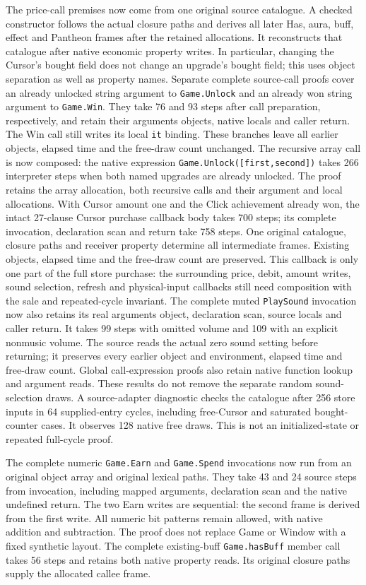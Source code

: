 \documentclass[11pt,a4paper]{article}
\numberwithin{equation}{section}
\theoremstyle{definition}
\theoremstyle{remark}
\begin{document}
The price-call premises now come from one original source catalogue. A checked constructor follows the actual closure paths and derives all later Has, aura, buff, effect and Pantheon frames after the retained allocations. It reconstructs that catalogue after native economic property writes. In particular, changing the Cursor's bought field does not change an upgrade's bought field; this uses object separation as well as property names. Separate complete source-call proofs cover an already unlocked string argument to \texttt{Game.Unlock} and an already won string argument to \texttt{Game.Win}. They take 76 and 93 steps after call preparation, respectively, and retain their arguments objects, native locals and caller return. The Win call still writes its local \texttt{it} binding. These branches leave all earlier objects, elapsed time and the free-draw count unchanged. The recursive array call is now composed: the native expression \texttt{Game.Unlock([first,second])} takes 266 interpreter steps when both named upgrades are already unlocked. The proof retains the array allocation, both recursive calls and their argument and local allocations. With Cursor amount one and the Click achievement already won, the intact 27-clause Cursor purchase callback body takes 700 steps; its complete invocation, declaration scan and return take 758 steps. One original catalogue, closure paths and receiver property determine all intermediate frames. Existing objects, elapsed time and the free-draw count are preserved. This callback is only one part of the full store purchase: the surrounding price, debit, amount writes, sound selection, refresh and physical-input callbacks still need composition with the sale and repeated-cycle invariant. The complete muted \texttt{PlaySound} invocation now also retains its real arguments object, declaration scan, source locals and caller return. It takes 99 steps with omitted volume and 109 with an explicit nonmusic volume. The source reads the actual zero sound setting before returning; it preserves every earlier object and environment, elapsed time and free-draw count. Global call-expression proofs also retain native function lookup and argument reads. These results do not remove the separate random sound-selection draws. A source-adapter diagnostic checks the catalogue after 256 store inputs in 64 supplied-entry cycles, including free-Cursor and saturated bought-counter cases. It observes 128 native free draws. This is not an initialized-state or repeated full-cycle proof.

The complete numeric \texttt{Game.Earn} and \texttt{Game.Spend} invocations now run from an original object array and original lexical paths. They take 43 and 24 source steps from invocation, including mapped arguments, declaration scan and the native undefined return. The two Earn writes are sequential: the second frame is derived from the first write. All numeric bit patterns remain allowed, with native addition and subtraction. The proof does not replace Game or Window with a fixed synthetic layout. The complete existing-buff \texttt{Game.hasBuff} member call takes 56 steps and retains both native property reads. Its original closure paths supply the allocated callee frame.
\end{document}
